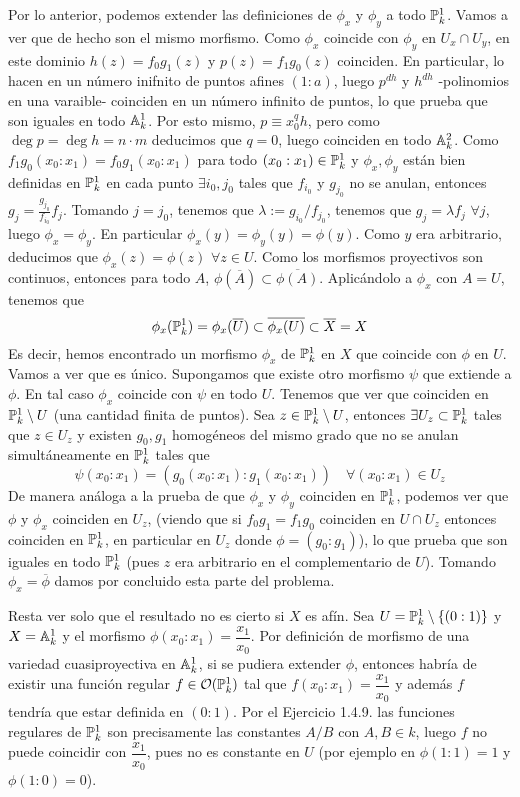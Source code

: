 \documentclass[twoside]{article}
\begin{document}
\begin{solucion}
Por lo anterior, podemos extender las definiciones de $\phi_x$ y $\phi_y$ a todo $\mathbb{P}^1_k$. Vamos a ver que de hecho son el mismo morfismo. Como $\phi_x$ coincide con $\phi_y$ en $U_x\cap U_y$, en este dominio $h(z)=f_0g_1(z)$ y $p(z)=f_1g_0(z)$ coinciden. En particular, lo hacen en un número inifnito de puntos afines $(1:a)$, luego $p^{dh}$ y $h^{dh}$ -polinomios en una varaible- coinciden en un número infinito de puntos, lo que prueba que son iguales en todo $\mathbb{A}^1_k$. Por esto mismo, $p \equiv x_0^qh$, pero como $\deg{p}=\deg{h} =n\cdot m$ deducimos que $q=0$, luego coinciden en todo $\mathbb{A}_k^2$. Como $f_1g_0(x_0:x_1)=f_0g_1(x_0:x_1)$ para todo $(x_0:x_1)\in \mathbb{P}^1_k$ y $\phi_x,\phi_y$ están bien definidas en $\mathbb{P}^1_k$ en cada punto $\exists i_0,j_0$ tales que $f_{i_0}$ y $g_{j_0}$ no se anulan, entonces $g_j = \frac{g_{j_0}}{f_{i_0}}f_j$. Tomando $j=j_0$, tenemos que $\lambda:=g_{i_0}/f_{j_0}$, tenemos que $g_j = \lambda f_j$ $\forall j$, luego $\phi_x = \phi_y$.
En particular $\phi_x(y)=\phi_y(y)=\phi(y)$. Como $y$ era arbitrario, deducimos que $\phi_x(z)=\phi(z)$ $\forall z \in U$. Como los morfismos proyectivos son continuos, entonces para todo $A$, $\phi(\overline{A})\subset \overline{\phi(A)}$. Aplicándolo a $\phi_x$ con $A=U$, tenemos que
$$
\phi_x(\mathbb{P}^1_k)=\phi_x(\overline{U}) \subset \overline{\phi_x({U})} \subset \overline{X} =X
$$
Es decir, hemos encontrado un morfismo $\phi_x$ de $\mathbb{P}^1_k$ en $X$ que coincide con $\phi$ en $U$. Vamos a ver que es único. Supongamos que existe otro morfismo $\psi$ que extiende a $\phi$. En tal caso $\phi_x$ coincide con $\psi$ en todo $U$. Tenemos que ver que coinciden en $\mathbb{P}^1_k\setminus U$ (una cantidad finita de puntos). Sea $z \in \mathbb{P}^1_k\setminus U$, entonces $\exists U_z \subset \mathbb{P}^1_k$ tales que $z\in U_z$ y existen $g_0,g_1$ homogéneos del mismo grado que no se anulan simultáneamente en $\mathbb{P}^1_k$ tales que
$$
\psi(x_0:x_1) = (g_0(x_0:x_1):g_1(x_0:x_1)) \quad \forall (x_0:x_1)\in U_z
$$
De manera análoga a la prueba de que $\phi_x$ y $\phi_y$ coinciden en $\mathbb{P}^1_k$, podemos ver que $\phi$  y $\phi_x$ coinciden en $U_z$, (viendo que si $f_0g_1 = f_1g_0$ coinciden en $U\cap U_z$ entonces coinciden en $\mathbb{P}^1_k$, en particular en $U_z$ donde $\phi = (g_0:g_1)$), lo que prueba que son iguales en todo $\mathbb{P}^1_k$ (pues $z$ era arbitrario en el complementario de $U$). Tomando $\phi_x = \overline{\phi}$ damos por concluido esta parte del problema.

Resta ver solo que el resultado no es cierto si $X$ es afín. Sea $U = \mathbb{P}^1_k\setminus\{(0:1)\}$ y $X=\mathbb{A}^1_k$ y el morfismo
$ \phi(x_0:x_1) = \dfrac{x_1}{x_0}$. Por definición de morfismo de una variedad cuasiproyectiva en $\mathbb{A}_k^1$, si se pudiera extender $\phi$, entonces habría de existir una función regular $f\in \mathcal{O}(\mathbb{P}^1_k)$ tal que $f(x_0:x_1) = \dfrac{x_1}{x_0}$ y además $f$ tendría que estar definida en $(0:1)$. Por el Ejercicio 1.4.9. las funciones regulares de $\mathbb{P}^1_k$ son precisamente las constantes $A/B$ con $A,B\in k$, luego $f$ no puede coincidir con $\dfrac{x_1}{x_0}$, pues no es constante en $U$ (por ejemplo en $\phi(1:1)=1$ y $\phi(1:0)=0$).


\end{solucion}
\end{document}
